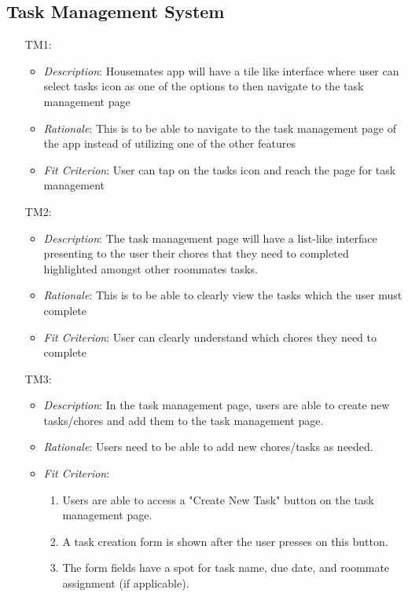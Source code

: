 \documentclass[12pt]{article}
\begin{document}
\subsection{Task Management System}
\noindent \begin{itemize}
    \item[TM1:] 
    \begin{itemize}
        \item \textit{Description}: Housemates app will have a tile like interface where user can select tasks icon as one of the options to then navigate to the task management page
        \item \textit{Rationale}: This is to be able to navigate to the task management page of the app instead of utilizing one of the other features
        \item \textit{Fit Criterion}: User can tap on the tasks icon and reach the page for task management
    \end{itemize}
    \item[TM2:] 
    \begin{itemize}
        \item \textit{Description}: The task management page will have a list-like interface presenting to the user their chores that they need to completed highlighted amongst other roommates tasks.
        \item \textit{Rationale}: This is to be able to clearly view the tasks which the user must complete
        \item \textit{Fit Criterion}: User can clearly understand which chores they need to complete
    \end{itemize}
    \item[TM3:] 
    \begin{itemize}
    \item \textit{Description}: In the task management page, users are able to create new tasks/chores and add them to the task management page.
    \item \textit{Rationale}: Users need to be able to add new chores/tasks as needed.
    \item \textit{Fit Criterion}: 
    \begin{enumerate}
        \item Users are able to access a "Create New Task" button on the task management page.
        \item A task creation form is shown after the user presses on this button.
        \item The form fields have a spot for task name, due date, and roommate assignment (if applicable).

\end{enumerate}
\end{itemize}
\end{itemize}
\end{document}
